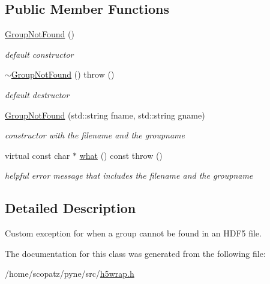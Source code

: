 \subsection*{Public Member Functions}
\begin{DoxyCompactItemize}
\item 
\hypertarget{classh5wrap_1_1_group_not_found_accc7d7bea9e86968335a46ee39d7d543}{\hyperlink{classh5wrap_1_1_group_not_found_accc7d7bea9e86968335a46ee39d7d543}{Group\-Not\-Found} ()}\label{classh5wrap_1_1_group_not_found_accc7d7bea9e86968335a46ee39d7d543}

\begin{DoxyCompactList}\small\item\em default constructor \end{DoxyCompactList}\item 
\hypertarget{classh5wrap_1_1_group_not_found_a79dea7d1d5e3ffd7a7e83b4a2636398a}{\hyperlink{classh5wrap_1_1_group_not_found_a79dea7d1d5e3ffd7a7e83b4a2636398a}{$\sim$\-Group\-Not\-Found} ()  throw ()}\label{classh5wrap_1_1_group_not_found_a79dea7d1d5e3ffd7a7e83b4a2636398a}

\begin{DoxyCompactList}\small\item\em default destructor \end{DoxyCompactList}\item 
\hypertarget{classh5wrap_1_1_group_not_found_a74f7e8f6efcf33503f5fec62eead40c3}{\hyperlink{classh5wrap_1_1_group_not_found_a74f7e8f6efcf33503f5fec62eead40c3}{Group\-Not\-Found} (std\-::string fname, std\-::string gname)}\label{classh5wrap_1_1_group_not_found_a74f7e8f6efcf33503f5fec62eead40c3}

\begin{DoxyCompactList}\small\item\em constructor with the filename and the groupname \end{DoxyCompactList}\item 
\hypertarget{classh5wrap_1_1_group_not_found_a76766dc5fda0a07564379db454df87d0}{virtual const char $\ast$ \hyperlink{classh5wrap_1_1_group_not_found_a76766dc5fda0a07564379db454df87d0}{what} () const   throw ()}\label{classh5wrap_1_1_group_not_found_a76766dc5fda0a07564379db454df87d0}

\begin{DoxyCompactList}\small\item\em helpful error message that includes the filename and the groupname \end{DoxyCompactList}\end{DoxyCompactItemize}


\subsection{Detailed Description}
Custom exception for when a group cannot be found in an H\-D\-F5 file. 

The documentation for this class was generated from the following file\-:\begin{DoxyCompactItemize}
\item 
/home/scopatz/pyne/src/\hyperlink{h5wrap_8h}{h5wrap.\-h}\end{DoxyCompactItemize}

